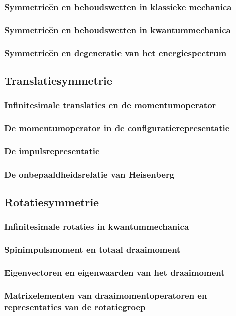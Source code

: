 \documentclass[a4paper,twoside]{article}
\theoremstyle{definition}
\theoremstyle{plain}
\begin{document}
\subsubsection{Symmetrieën en behoudswetten in klassieke mechanica}
\subsubsection{Symmetrieën en behoudswetten in kwantummechanica}
\subsubsection{Symmetrieën en degeneratie van het energiespectrum}
\subsection{Translatiesymmetrie}
\subsubsection{Infinitesimale translaties en de momentumoperator}
\subsubsection{De momentumoperator in de configuratierepresentatie}
\subsubsection{De impulsrepresentatie}
\subsubsection{De onbepaaldheidsrelatie van Heisenberg}
\subsection{Rotatiesymmetrie}
\subsubsection{Infinitesimale rotaties in kwantummechanica}
\subsubsection{Spinimpulsmoment en totaal draaimoment}
\subsubsection{Eigenvectoren en eigenwaarden van het draaimoment}
\subsubsection{Matrixelementen van draaimomentoperatoren en representaties van de rotatiegroep}
\end{document}
